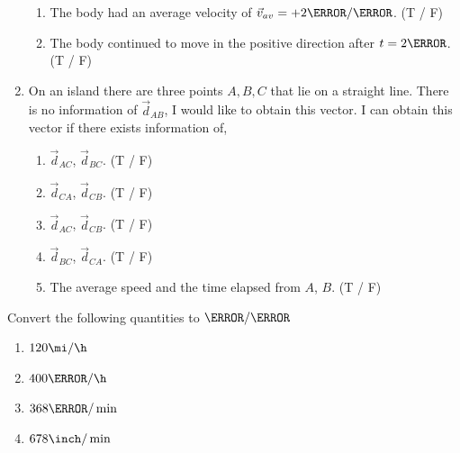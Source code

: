 \documentclass[12pt]{article} %
\begin{document}
\begin{qstn}[1]
\begin{enumerate}
\begin{figure}[h]
\end{figure}
	\begin{enumerate}[label = (\alph*)]
		\item The body had an average velocity of $\vec v_{av} = +2 \m / \s$. (T / F)
		\item The body continued to move in the positive direction after $t = 2\s$. (T / F)
	\end{enumerate}

\item On an island there are three points $A,B,C$ that lie on a straight line. There is no information of $\vec d_{AB}$, I would like to obtain this vector. I can obtain this vector if there exists information of,
	\begin{enumerate}[label = (\alph*)]
		\item $\vec d_{AC}$, $\vec d_{BC}$. (T / F)
		\item $\vec d_{CA}$, $\vec d_{CB}$. (T / F)
		\item $\vec d_{AC}$, $\vec d_{CB}$. (T / F)
		\item $\vec d_{BC}$, $\vec d_{CA}$. (T / F)
		\item The average speed and the time elapsed from $A$, $B$. (T / F) 
	\end{enumerate}
 


\end{enumerate}


\end{qstn}



\begin{qstn}[2] %
	Convert the following quantities to $\m / \s$
	\begin{enumerate}[label = (\alph*)]
		\item $120 \mi / \h$
		\vspace*{4cm}

		\item $400 \km / \h$
		\vspace*{4cm}
		
		\item $368 \m / \min$
		\vspace*{4cm}

		\item $678 \inch / \min$
		\vspace*{4cm}

	\end{enumerate}

\end{qstn}
\end{document}
